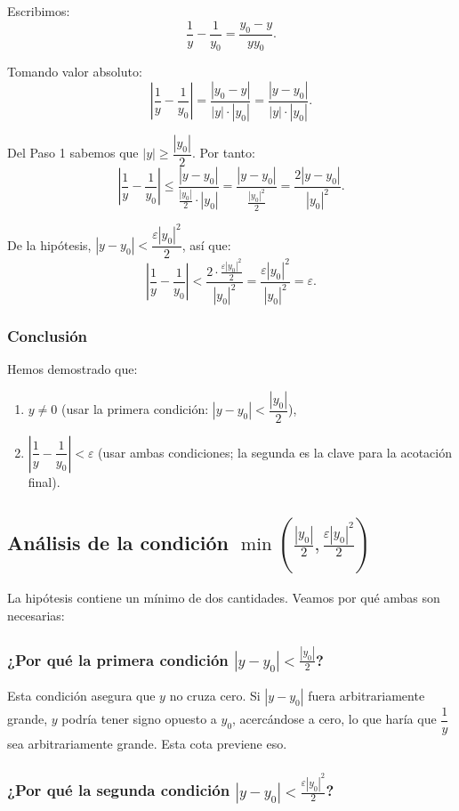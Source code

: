 Escribimos:
\[
\frac{1}{y} - \frac{1}{y_0} = \frac{y_0 - y}{yy_0}.
\]

Tomando valor absoluto:
\[
\left|\frac{1}{y} - \frac{1}{y_0}\right| = \frac{|y_0 - y|}{|y| \cdot |y_0|} = \frac{|y - y_0|}{|y| \cdot |y_0|}.
\]

Del Paso 1 sabemos que $|y| \geq \dfrac{|y_0|}{2}$. Por tanto:
\[
\left|\frac{1}{y} - \frac{1}{y_0}\right| \leq \frac{|y - y_0|}{\frac{|y_0|}{2} \cdot |y_0|} = \frac{|y - y_0|}{\frac{|y_0|^2}{2}} = \frac{2|y - y_0|}{|y_0|^2}.
\]

De la hipótesis, $|y - y_0| < \dfrac{\varepsilon|y_0|^2}{2}$, así que:
\[
\left|\frac{1}{y} - \frac{1}{y_0}\right| < \frac{2 \cdot \frac{\varepsilon|y_0|^2}{2}}{|y_0|^2} = \frac{\varepsilon|y_0|^2}{|y_0|^2} = \varepsilon.
\]

\subsubsection*{Conclusión}

Hemos demostrado que:
\begin{enumerate}
\item $y \neq 0$ (usar la primera condición: $|y - y_0| < \dfrac{|y_0|}{2}$),
\item $\left|\dfrac{1}{y} - \dfrac{1}{y_0}\right| < \varepsilon$ (usar ambas condiciones; la segunda es la clave para la acotación final).
\end{enumerate}

\subsection*{Análisis de la condición $\min\left(\frac{|y_0|}{2}, \frac{\varepsilon|y_0|^2}{2}\right)$}

La hipótesis contiene un mínimo de dos cantidades. Veamos por qué ambas son necesarias:

\subsubsection*{¿Por qué la primera condición $|y - y_0| < \frac{|y_0|}{2}$?}

Esta condición asegura que $y$ no cruza cero. Si $|y - y_0|$ fuera arbitrariamente grande, $y$ podría tener signo opuesto a $y_0$, acercándose a cero, lo que haría que $\dfrac{1}{y}$ sea arbitrariamente grande. Esta cota previene eso.

\subsubsection*{¿Por qué la segunda condición $|y - y_0| < \frac{\varepsilon|y_0|^2}{2}$?}

